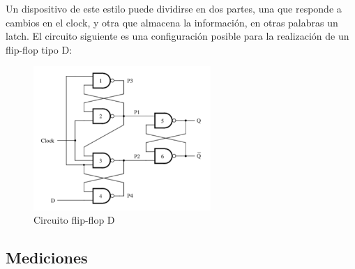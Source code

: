 Un dispositivo de este estilo puede dividirse en dos partes, una que responde a cambios en el clock, y otra que almacena la información, en otras palabras un latch. El circuito siguiente es una configuración posible para la realización de un flip-flop tipo D:

\begin{figure}[H]
	\centering
	\includegraphics[width=0.6\textwidth]{Ejercicio6/Recursos/flipflopDcircuito}
	\caption{Circuito flip-flop D}
\end{figure}

\subsection{Mediciones}


